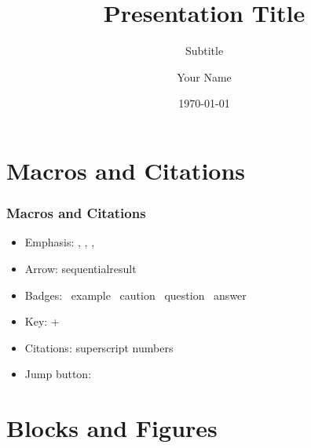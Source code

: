 \documentclass[aspectratio=169, 10pt, fleqn, hyperref={pdfpagelabels=false, bookmarks=false, hyperfootnotes=false}]{beamer}
\title{Presentation Title}
\subtitle{\fontsize{10pt}{0pt}\selectfont {\emdash}Subtitle{\emdash}}
\author{Your Name}
\institute{} %
\date{\footnotesize{\today}}
\begin{document}
\addtocounter{framenumber}{-1} %

\begin{frame}[label=title]
  \titlepage
\end{frame}

\section{Macros and Citations}

\begin{frame}[label=macros]
  \frametitle{Macros and Citations}
  \begin{itemize}
    \item Emphasis: , , , 
    \item Arrow: sequential\arrow result
    \item Badges: \examplebadge~example \notebadge~caution \questionbadge~question \answerbadge~answer
    \item Key: +
    \item Citations: superscript numbers\cite{nuseibeh2000}\cite{royce1970}\cite{vanlamsweerde2001}
    \item Jump button: 
  \end{itemize}
\end{frame}

\section{Blocks and Figures}
\end{document}
